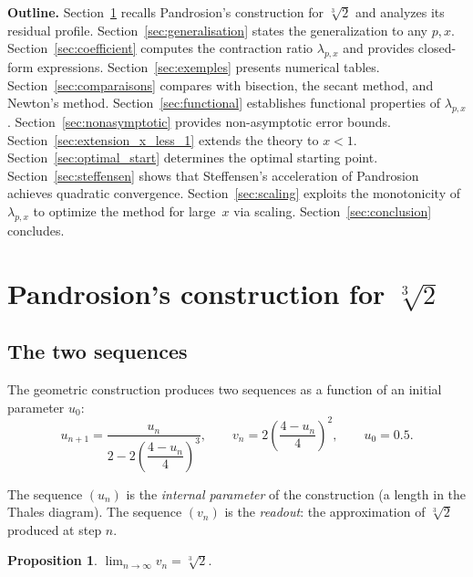 \documentclass[11pt,a4paper]{article}
\theoremstyle{definition}
\newtheorem{proposition}{Proposition}[section]
\newcommand{\cbrt}[1]{\sqrt[3]{#1}}
\begin{document}
\medskip

\textbf{Outline.} Section~\ref{sec:pandrosion3} recalls Pandrosion's construction for $\cbrt{2}$ and analyzes its residual profile. Section~\ref{sec:generalisation} states the generalization to any $p, x$. Section~\ref{sec:coefficient} computes the contraction ratio $\lambda_{p,x}$ and provides closed-form expressions. Section~\ref{sec:exemples} presents numerical tables. Section~\ref{sec:comparaisons} compares with bisection, the secant method, and Newton's method. Section~\ref{sec:functional} establishes functional properties of $\lambda_{p,x}$. Section~\ref{sec:nonasymptotic} provides non-asymptotic error bounds. Section~\ref{sec:extension_x_less_1} extends the theory to $x < 1$. Section~\ref{sec:optimal_start} determines the optimal starting point. Section~\ref{sec:steffensen} shows that Steffensen's acceleration of Pandrosion achieves quadratic convergence. Section~\ref{sec:scaling} exploits the monotonicity of $\lambda_{p,x}$ to optimize the method for large~$x$ via scaling. Section~\ref{sec:conclusion} concludes.

\section{Pandrosion's construction for \texorpdfstring{$\cbrt{2}$}{cbrt(2)}}
\label{sec:pandrosion3}

\subsection{The two sequences}

The geometric construction produces two sequences as a function of an initial parameter $u_0$:
\begin{equation}
  \label{eq:pandrosion_orig}
  u_{n+1} = \frac{u_n}{2 - 2\!\left(\dfrac{4 - u_n}{4}\right)^{\!3}},
  \qquad
  v_n = 2\!\left(\frac{4 - u_n}{4}\right)^{\!2},
  \qquad u_0 = 0.5.
\end{equation}

The sequence $(u_n)$ is the \emph{internal parameter} of the construction (a length in the Thales diagram). The sequence $(v_n)$ is the \emph{readout}: the approximation of $\cbrt{2}$ produced at step $n$.

\begin{proposition}
$\displaystyle\lim_{n\to\infty} v_n = \cbrt{2}$.
\end{proposition}
\end{document}

